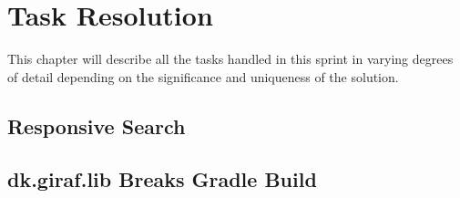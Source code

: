 \chapter{Task Resolution}
This chapter will describe all the tasks handled in this sprint in varying degrees of detail depending on the significance and uniqueness of the solution.



\section{Responsive Search}\label{RSearch}




\section{dk.giraf.lib Breaks Gradle Build}

